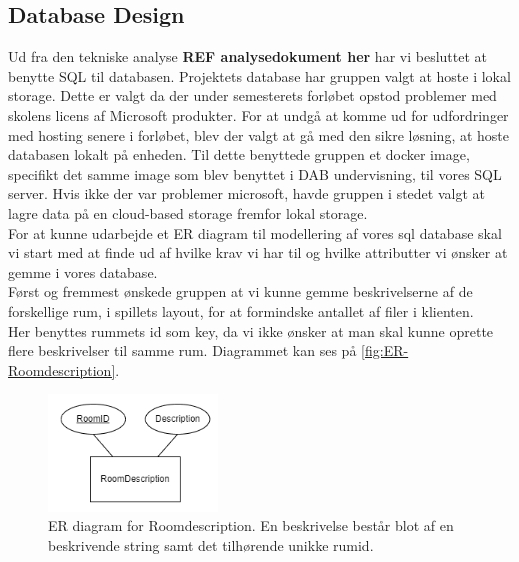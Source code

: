 \subsection{Database Design}
\label{ssec:DB Design}
Ud fra den tekniske analyse \textbf{REF analysedokument her} har vi besluttet at benytte SQL til databasen. 
Projektets database har gruppen valgt at hoste i lokal storage. Dette er valgt da der under semesterets forløbet opstod problemer med skolens licens af Microsoft produkter. For at undgå at komme ud for udfordringer med hosting senere i forløbet, blev der valgt at gå med den sikre løsning, at hoste databasen lokalt på enheden. Til dette benyttede gruppen et docker image\cite{SQL server with docker}, specifikt det samme image som blev benyttet i DAB undervisning, til vores SQL server.
Hvis ikke der var problemer microsoft, havde gruppen i stedet valgt at lagre data på en cloud-based storage fremfor lokal storage.\\

\noindent For at kunne udarbejde et ER diagram til modellering af vores sql database skal vi start med at finde ud af hvilke krav vi har til og hvilke attributter vi ønsker at gemme i vores database.\\
Først og fremmest ønskede gruppen at vi kunne gemme beskrivelserne af de forskellige rum, i spillets layout, for at formindske antallet af filer i klienten.\\ 
Her benyttes rummets id som key, da vi ikke ønsker at man skal kunne oprette flere beskrivelser til samme rum. Diagrammet kan ses på \autoref{fig:ER-Roomdescription}.

\begin{figure}[H]
\centering
\includegraphics[width = 0.4\textwidth]{02-Body/Images/ER-RoomDescription.PNG}
\caption{ER diagram for Roomdescription. En beskrivelse består blot af en beskrivende string samt det tilhørende unikke rumid.}
\label{fig:ER-Roomdescription}
\end{figure}

